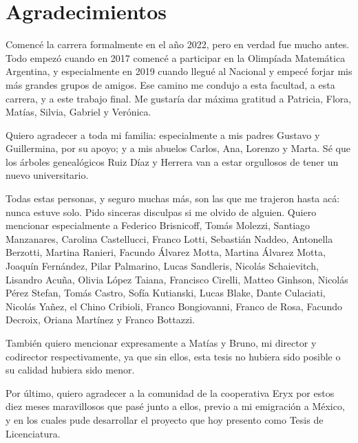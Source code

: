 \chapter*{Agradecimientos}

\noindent Comencé la carrera formalmente en el año 2022, pero en verdad fue mucho antes. Todo empezó cuando en 2017 comencé a participar en la Olimpíada Matemática Argentina, y especialmente en 2019 cuando llegué al Nacional y empecé forjar mis más grandes grupos de amigos. Ese camino me condujo a esta facultad, a esta carrera, y a este trabajo final. Me gustaría dar máxima gratitud a Patricia, Flora, Matías, Silvia, Gabriel y Verónica.

\vspace{\baselineskip}

\noindent Quiero agradecer a toda mi familia: especialmente a mis padres Gustavo y Guillermina, por su apoyo; y a mis abuelos Carlos, Ana, Lorenzo y Marta. Sé que los árboles genealógicos Ruiz Díaz y Herrera van a estar orgullosos de tener un nuevo universitario.

\vspace{\baselineskip}

\noindent Todas estas personas, y seguro muchas más, son las que me trajeron hasta acá: nunca estuve solo. Pido sinceras disculpas si me olvido de alguien. Quiero mencionar especialmente a Federico Brisnicoff, Tomás Molezzi, Santiago Manzanares, Carolina Castellucci, Franco Lotti, Sebastián Naddeo, Antonella Berzotti, Martina Ranieri, Facundo Álvarez Motta, Martina Álvarez Motta, Joaquín Fernández, Pilar Palmarino, Lucas Sandleris, Nicolás Schaievitch, Lisandro Acuña, Olivia López Taiana, Francisco Cirelli, Matteo Ginhson, Nicolás Pérez Stefan, Tomás Castro, Sofía Kutianski, Lucas Blake, Dante Culaciati, Nicolás Yañez, el Chino Cribioli, Franco Bongiovanni, Franco de Rosa, Facundo Decroix, Oriana Martínez y Franco Bottazzi.

\vspace{\baselineskip}

\noindent También quiero mencionar expresamente a Matías y Bruno, mi director y codirector respectivamente, ya que sin ellos, esta tesis no hubiera sido posible o su calidad hubiera sido menor.

\vspace{\baselineskip}

\noindent Por último, quiero agradecer a la comunidad de la cooperativa Eryx por estos diez meses maravillosos que pasé junto a ellos, previo a mi emigración a México, y en los cuales pude desarrollar el proyecto que hoy presento como Tesis de Licenciatura.
